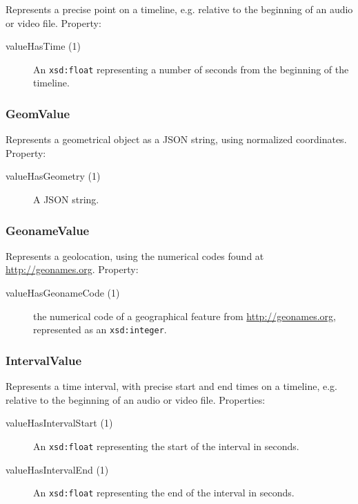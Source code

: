\documentclass[12pt, a4paper]{article}
\begin{document}
Represents a precise point on a timeline, e.g. relative to the beginning of an audio or video file. Property:

\begin{description}
	\item[valueHasTime (1)]	An \texttt{xsd:float} representing a number of seconds from the beginning of the timeline.
\end{description}

\subsubsection{GeomValue}

Represents a geometrical object as a JSON string, using normalized coordinates. Property:

\begin{description}
	\item[valueHasGeometry (1)] A JSON string.
\end{description}

\subsubsection{GeonameValue}

Represents a geolocation, using the numerical codes found at \url{http://geonames.org}. Property:

\begin{description}
	\item[valueHasGeonameCode (1)] the numerical code of a geographical feature from \url{http://geonames.org}, represented as an \texttt{xsd:integer}.
\end{description}

\subsubsection{IntervalValue}

Represents a time interval, with precise start and end times on a timeline, e.g. relative to the beginning of an audio or video file. Properties:

\begin{description}
	\item[valueHasIntervalStart (1)] An \texttt{xsd:float} representing the start of the interval in seconds.
	\item[valueHasIntervalEnd (1)]	An \texttt{xsd:float} representing the end of the interval in seconds.
\end{description}
\end{document}
